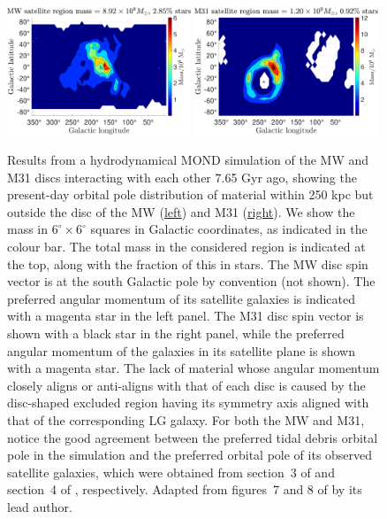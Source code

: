 \documentclass[fleqn,usenatbib,useAMS]{mnras} %
\begin{document}
\begin{figure}
	\centering
	\includegraphics[width=0.49\textwidth]{MW_SP_50}
	\hfill
	\includegraphics[width=0.49\textwidth]{M31_SP_50}
	\caption{Results from a hydrodynamical MOND simulation of the MW and M31 discs interacting with each other 7.65 Gyr ago, showing the present-day orbital pole distribution of material within 250 kpc but outside the disc of the MW (\underline{left}) and M31 (\underline{right}). We show the mass in $6^\circ \times 6^\circ$ squares in Galactic coordinates, as indicated in the colour bar. The total mass in the considered region is indicated at the top, along with the fraction of this in stars. The MW disc spin vector is at the south Galactic pole by convention (not shown). The preferred angular momentum of its satellite galaxies is indicated with a magenta star in the left panel. The M31 disc spin vector is shown with a black star in the right panel, while the preferred angular momentum of the galaxies in its satellite plane is shown with a magenta star. The lack of material whose angular momentum closely aligns or anti-aligns with that of each disc is caused by the disc-shaped excluded region having its symmetry axis aligned with that of the corresponding LG galaxy. For both the MW and M31, notice the good agreement between the preferred tidal debris orbital pole in the simulation and the preferred orbital pole of its observed satellite galaxies, which were obtained from section~3 of \citet{Pawlowski_2013_VPOS} and section~4 of \citet{Pawlowski_2013_LG}, respectively. Adapted from figures~7 and 8 of \citet{Banik_2022_satellite_plane} by its lead author.}
	\label{PoR_SP_50}
\end{figure}
\end{document}
